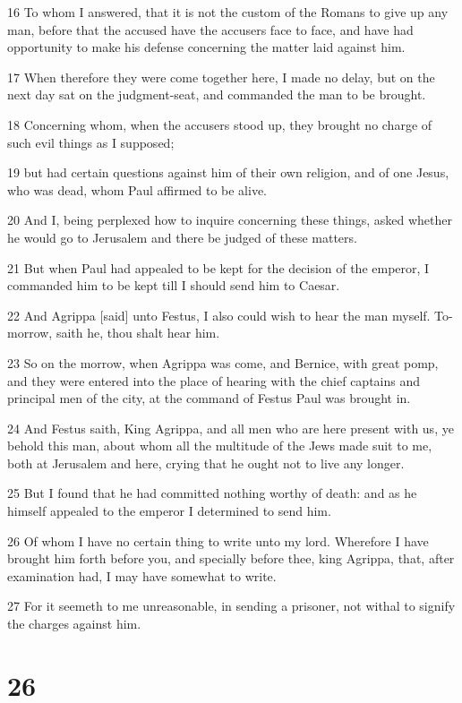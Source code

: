\par 16 To whom I answered, that it is not the custom of the Romans to give up any man, before that the accused have the accusers face to face, and have had opportunity to make his defense concerning the matter laid against him.
\par 17 When therefore they were come together here, I made no delay, but on the next day sat on the judgment-seat, and commanded the man to be brought.
\par 18 Concerning whom, when the accusers stood up, they brought no charge of such evil things as I supposed;
\par 19 but had certain questions against him of their own religion, and of one Jesus, who was dead, whom Paul affirmed to be alive.
\par 20 And I, being perplexed how to inquire concerning these things, asked whether he would go to Jerusalem and there be judged of these matters.
\par 21 But when Paul had appealed to be kept for the decision of the emperor, I commanded him to be kept till I should send him to Caesar.
\par 22 And Agrippa [said] unto Festus, I also could wish to hear the man myself. To-morrow, saith he, thou shalt hear him.
\par 23 So on the morrow, when Agrippa was come, and Bernice, with great pomp, and they were entered into the place of hearing with the chief captains and principal men of the city, at the command of Festus Paul was brought in.
\par 24 And Festus saith, King Agrippa, and all men who are here present with us, ye behold this man, about whom all the multitude of the Jews made suit to me, both at Jerusalem and here, crying that he ought not to live any longer.
\par 25 But I found that he had committed nothing worthy of death: and as he himself appealed to the emperor I determined to send him.
\par 26 Of whom I have no certain thing to write unto my lord. Wherefore I have brought him forth before you, and specially before thee, king Agrippa, that, after examination had, I may have somewhat to write.
\par 27 For it seemeth to me unreasonable, in sending a prisoner, not withal to signify the charges against him.

\chapter{26}

